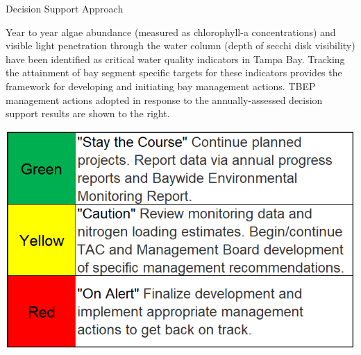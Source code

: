\documentclass[final,t]{beamer}\usepackage[]{graphicx}\usepackage[]{color}
\begin{document}
\begin{frame}
\begin{columns}[t]
\begin{column}{.63\linewidth}
\begin{block}{Decision Support Approach}
\begin{minipage}{0.5\textwidth}
\scriptsize
Year to year algae abundance (measured as chlorophyll-a concentrations) and visible light penetration through the water column (depth of secchi disk visibility) have been identified as critical water quality indicators in Tampa Bay. Tracking the attainment of bay segment specific targets for these indicators provides the framework for developing and initiating bay management actions. TBEP management actions adopted in response to the annually-assessed decision support results are shown to the right.
\end{minipage}
\hspace{0.01in}
\begin{minipage}{0.45\textwidth}
\includegraphics[width=\textwidth]{www/stoplight.PNG}
\end{minipage}
\end{block}


\end{column}
\end{columns}
\end{frame}
\end{document}
